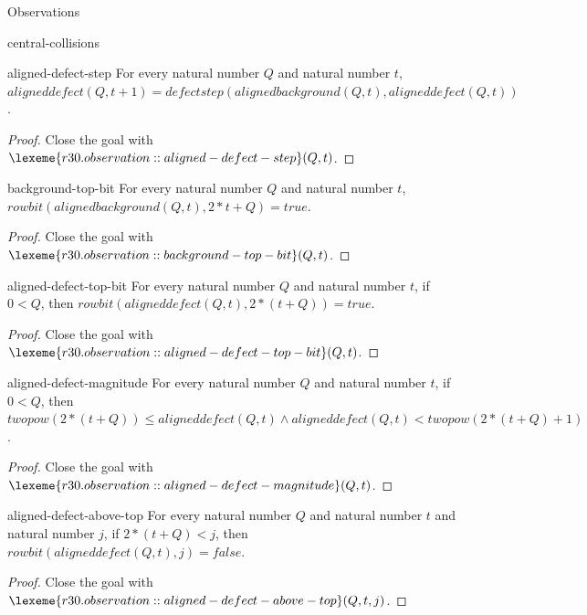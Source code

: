 \begin{lexlean}{Observations}
\begin{section}{central-collisions}
\begin{theorem}{aligned-defect-step}
For every natural number \(Q\) and natural number \(t\), \(aligneddefect(Q, t + 1) = defectstep(alignedbackground(Q, t), aligneddefect(Q, t))\).
\begin{proof}
Close the goal with \(\lexeme{r30.observation::aligned-defect-step}(Q, t)\).
\end{proof}
\end{theorem}

\begin{theorem}{background-top-bit}
For every natural number \(Q\) and natural number \(t\), \(rowbit(alignedbackground(Q, t), 2 * t + Q) = true\).
\begin{proof}
Close the goal with \(\lexeme{r30.observation::background-top-bit}(Q, t)\).
\end{proof}
\end{theorem}

\begin{theorem}{aligned-defect-top-bit}
For every natural number \(Q\) and natural number \(t\), if \(0 < Q\), then \(rowbit(aligneddefect(Q, t), 2 * (t + Q)) = true\).
\begin{proof}
Close the goal with \(\lexeme{r30.observation::aligned-defect-top-bit}(Q, t)\).
\end{proof}
\end{theorem}

\begin{theorem}{aligned-defect-magnitude}
For every natural number \(Q\) and natural number \(t\), if \(0 < Q\), then \(twopow(2 * (t + Q)) ≤ aligneddefect(Q, t) ∧ aligneddefect(Q, t) < twopow(2 * (t + Q) + 1)\).
\begin{proof}
Close the goal with \(\lexeme{r30.observation::aligned-defect-magnitude}(Q, t)\).
\end{proof}
\end{theorem}

\begin{theorem}{aligned-defect-above-top}
For every natural number \(Q\) and natural number \(t\) and natural number \(j\), if \(2 * (t + Q) < j\), then \(rowbit(aligneddefect(Q, t), j) = false\).
\begin{proof}
Close the goal with \(\lexeme{r30.observation::aligned-defect-above-top}(Q, t, j)\).
\end{proof}
\end{theorem}


\end{section}
\end{lexlean}
